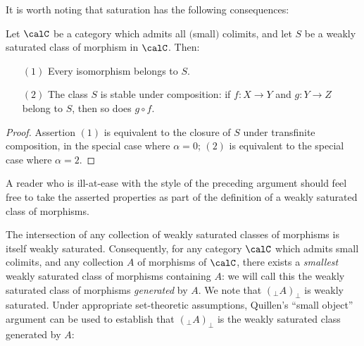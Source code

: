 It is worth noting that saturation has the following consequences:

\begin{proposition}
Let $\calC$ be a category which admits all $($small$)$ colimits, and let $S$ be a weakly saturated class of morphism in $\calC$. Then:
\begin{itemize}
\item[$(1)$] Every isomorphism belongs to $S$.
\item[$(2)$] The class $S$ is stable under composition: if $f: X \rightarrow Y$ and $g: Y \rightarrow Z$ belong to $S$, then so does $g \circ f$.
\end{itemize}
\end{proposition}

\begin{proof}
Assertion $(1)$ is equivalent to the closure of $S$ under transfinite composition, in the special case where $\alpha=0$; $(2)$ is equivalent to the special case where $\alpha=2$.
\end{proof}

\begin{remark}
A reader who is ill-at-ease with the style of the preceding argument should feel free to take
the asserted properties as part of the definition of a weakly saturated class of morphisms.
\end{remark}

The intersection of any collection of weakly saturated classes of morphisms is itself weakly saturated. Consequently, for any category $\calC$ which admits small colimits, and any collection
$A$ of morphisms of $\calC$, there exists a {\em smallest} weakly saturated class of morphisms containing $A$: we will call this the weakly saturated class of morphisms {\it generated} by $A$.
We note that $(_{\perp} A)_{\perp}$ is weakly saturated. Under appropriate set-theoretic assumptions, Quillen's ``small object'' argument can be used to establish that $(_{\perp} A)_{\perp}$ is the weakly saturated class generated by $A$:

